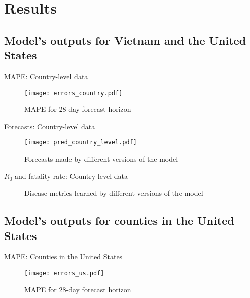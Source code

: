 \section{Results}

\subsection{Model's outputs for Vietnam and the United States}

\begin{frame}{MAPE: Country-level data}
    \begin{figure}[h]
        \centering
        \texttt{[image: errors\_country.pdf]}
        \caption{MAPE for 28-day forecast horizon}
    \end{figure}
\end{frame}

\begin{frame}{Forecasts: Country-level data}
    \begin{figure}[!htb]
        \centering
        \texttt{[image: pred\_country\_level.pdf]}
        \caption{Forecasts made by different versions of the model}
    \end{figure}
\end{frame}

\begin{frame}{$R_0$ and fatality rate: Country-level data}
    \begin{figure}[!htb]
        \centering
        \caption{Disease metrics learned by different versions of the model}
    \end{figure}
\end{frame}

\subsection{Model's outputs for counties in the United States}

\begin{frame}{MAPE: Counties in the United States}
    \begin{figure}[h]
        \centering
        \texttt{[image: errors\_us.pdf]}
        \caption{MAPE for 28-day forecast horizon}
    \end{figure}
\end{frame}

